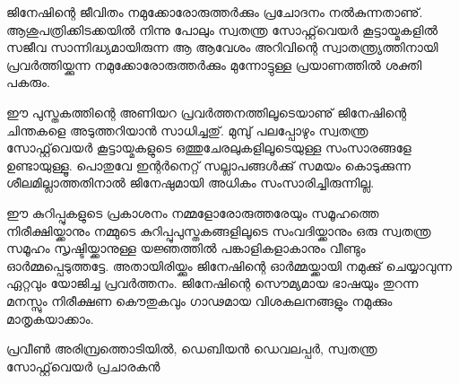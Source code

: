 
ജിനേഷിന്റെ ജീവിതം നമുക്കോരോരുത്തര്‍ക്കും പ്രചോദനം നല്‍കുന്നതാണു്. ആശുപത്രിക്കിടക്കയില്‍ നിന്നു പോലും സ്വതന്ത്ര സോഫ്റ്റ്‌വെയര്‍ കൂട്ടായ്മകളില്‍ സജീവ സാന്നിദ്ധ്യമായിരുന്ന ആ ആവേശം അറിവിന്റെ സ്വാതന്ത്ര്യത്തിനായി പ്രവര്‍ത്തിയ്ക്കുന്ന നമുക്കോരോരുത്തര്‍ക്കും മുന്നോട്ടുള്ള പ്രയാണത്തില്‍ ശക്തി പകരും. 

ഈ പുസ്തകത്തിന്റെ അണിയറ പ്രവര്‍ത്തനത്തിലൂടെയാണു് ജിനേഷിന്റെ ചിന്തകളെ അടുത്തറിയാന്‍ സാധിച്ചതു്. മുമ്പു് പലപ്പോഴും സ്വതന്ത്ര സോഫ്റ്റ്‌വെയര്‍ കൂട്ടായ്മകളുടെ ഒത്തുചേരലുകളിലൂടെയുള്ള സംസാരങ്ങളേ ഉണ്ടായുള്ളൂ. പൊതുവേ ഇന്റര്‍നെറ്റ് സല്ലാപങ്ങള്‍ക്കു് സമയം കൊടുക്കുന്ന ശീലമില്ലാത്തതിനാല്‍ ജിനേഷുമായി അധികം സംസാരിച്ചിരുന്നില്ല.

ഈ കുറിപ്പുകളുടെ പ്രകാശനം നമ്മളോരോരുത്തരേയും സമൂഹത്തെ നിരീക്ഷിയ്ക്കാനും നമ്മുടെ കുറിപ്പുപുസ്തകങ്ങളിലൂടെ സംവദിയ്ക്കാനും ഒരു സ്വതന്ത്ര സമൂഹം സൃഷ്ടിയ്ക്കാനുള്ള യജ്ഞത്തില്‍ പങ്കാളികളാകാനും വീണ്ടും ഓര്‍മ്മപ്പെടുത്തട്ടേ. അതായിരിയ്ക്കും ജിനേഷിന്റെ ഓര്‍മ്മയ്ക്കായി നമുക്കു് ചെയ്യാവുന്ന ഏറ്റവും യോജിച്ച പ്രവര്‍ത്തനം. ജിനേഷിന്റെ സൌമ്യമായ ഭാഷയും തുറന്ന മനസ്സും നിരീക്ഷണ കൌതുകവും ഗാഢമായ വിശകലനങ്ങളും നമുക്കും മാതൃകയാക്കാം.

പ്രവീണ്‍ അരിമ്പ്രത്തൊടിയില്‍, ഡെബിയന്‍ ഡെവലപ്പര്‍, സ്വതന്ത്ര സോഫ്റ്റ്‌വെയര്‍ പ്രചാരകന്‍
\newpage

